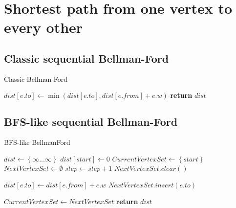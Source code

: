 \chapter{Shortest path from one vertex to every other}


\FloatBarrier
\section{Classic sequential Bellman-Ford}

\FloatBarrier
\begin{algorithm}
\caption{Classic Bellman-Ford}\label{bf_classic_seq}
\begin{algorithmic}[1]
 
		\State $dist[e.to] \gets \min(dist[e.to], dist[e.from] + e.w)$
	\EndFor
\EndFor
\State \textbf{return} $dist$
\EndProcedure
\end{algorithmic}
\end{algorithm}

\FloatBarrier
\section{BFS-like sequential Bellman-Ford}

\FloatBarrier
\begin{algorithm}
\caption{BFS-like BellmanFord}\label{bf_bfs_seq}
\begin{algorithmic}[1]
\State $dist\gets \left\{ {\infty ... \infty}\right\}$
\State $dist[start] \gets 0$
\State $CurrentVertexSet \gets \left\{ {start}\right\}$ 
\State $NextVertexSet \gets \emptyset$ 
	\State $step \gets step + 1$
	\State $NextVertexSet.clear()$
	
		  
				\State $dist[e.to] \gets dist[e.from] + e.w$
				\State $NextVertexSet.insert(e.to)$								
			\EndIf
		\EndFor
	\EndFor
	
	\State $CurrentVertexSet \gets NextVertexSet$	
\EndWhile
\State \textbf{return} $dist$

\EndProcedure
\end{algorithmic}
\end{algorithm}


